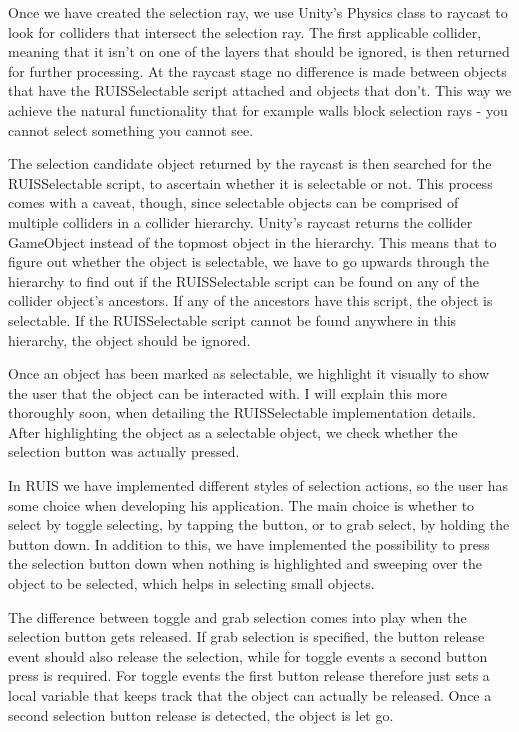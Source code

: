 \documentclass[12pt,a4paper,oneside,pdftex]{report}
\begin{document}
Once we have created the selection ray, we use Unity's Physics class to raycast to look for colliders that intersect the selection ray. The first applicable collider, meaning that it isn't on one of the layers that should be ignored, is then returned for further processing. At the raycast stage no difference is made between objects that have the RUISSelectable script attached and objects that don't. This way we achieve the natural functionality that for example walls block selection rays - you cannot select something you cannot see.

The selection candidate object returned by the raycast is then searched for the RUISSelectable script, to ascertain whether it is selectable or not. This process comes with a caveat, though, since selectable objects can be comprised of multiple colliders in a collider hierarchy. Unity's raycast returns the collider GameObject instead of the topmost object in the hierarchy. This means that to figure out whether the object is selectable, we have to go upwards through the hierarchy to find out if the RUISSelectable script can be found on any of the collider object's ancestors. If any of the ancestors have this script, the object is selectable. If the RUISSelectable script cannot be found anywhere in this hierarchy, the object should be ignored.

Once an object has been marked as selectable, we highlight it visually to show the user that the object can be interacted with. I will explain this more thoroughly soon, when detailing the RUISSelectable implementation details. After highlighting the object as a selectable object, we check whether the selection button was actually pressed.

In RUIS we have implemented different styles of selection actions, so the user has some choice when developing his application. The main choice is whether to select by toggle selecting, by tapping the button, or to grab select, by holding the button down. In addition to this, we have implemented the possibility to press the selection button down when nothing is highlighted and sweeping over the object to be selected, which helps in selecting small objects.

The difference between toggle and grab selection comes into play when the selection button gets released. If grab selection is specified, the button release event should also release the selection, while for toggle events a second button press is required. For toggle events the first button release therefore just sets a local variable that keeps track that the object can actually be released. Once a second selection button release is detected, the object is let go. 
\end{document}
